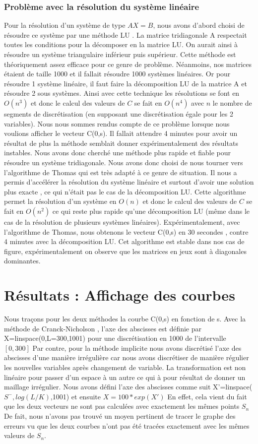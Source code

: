 \documentclass[11pt,a4paper]{article}
\begin{document}
\subsubsection{Problème avec la résolution du système linéaire}
Pour la résolution d'un système de type  $AX=B$, nous avons d'abord choisi de résoudre ce système par une méthode LU . La matrice tridiagonale A respectait toutes les conditions pour la décomposer en la matrice LU. On aurait ainsi à résoudre un système triangulaire inférieur puis supérieur. Cette méthode est théoriquement assez efficace pour ce genre de problème. Néanmoins, nos matrices étaient de taille 1000 et il fallait résoudre 1000 systèmes linéaires. Or pour résoudre 1 système linéaire, il faut faire la décomposition LU de la matrice A et résoudre 2 sous systèmes. Ainsi avec cette technique les résolutions se font en $O(n^3)$ et donc le calcul des valeurs de $C$ se fait en $O(n^4)$ avec $n$ le nombre de segments de discrétisation (en supposant une discrétisation égale pour les 2 variables). Nous nous sommes rendus compte de ce problème lorsque nous voulions afficher le vecteur C(0,s). Il fallait attendre 4 minutes pour avoir un résultat de plus la méthode semblait donner expérimentalement des résultats instables.
Nous avons donc cherché une méthode plus rapide et fiable pour résoudre un système tridiagonale. Nous avons donc choisi de nous tourner vers l'algorithme de Thomas qui est très adapté à ce genre de situation. Il nous a permis d'accélérer la résolution du système linéaire et surtout d'avoir une solution plus exacte , ce qui n'était pas le cas de la décomposition LU. Cette algorithme permet la résolution d'un système en $O(n)$ et donc le calcul des valeurs de $C$ se fait en $O(n^2)$ ce qui reste plus rapide qu'une décomposition LU (même dans le cas de la résolution de plusieurs systèmes linéaires). Expérimentalement, avec l'algorithme de Thomas, nous obtenons le vecteur C(0,s) en 30 secondes , contre 4 minutes avec la décomposition LU. Cet algorithme est stable dans nos cas de figure, expérimentalement on observe que les matrices en jeux sont à diagonales dominantes.
\section{Résultats : Affichage des courbes}
Nous traçons pour les deux méthodes la courbe C(0,s) en fonction de s.
Avec la méthode de Cranck-Nicholson , l'axe des abscisses est définie par X=linspace(0,L=300,1001) pour une discrétisation en 1000 de l'intervalle $[0,300]$
Par contre, pour la méthode implicite nous avons discrétisé l'axe des abscisses d'une manière irrégulière car nous avons discrétiser de manière régulier les nouvelles variables après changement de variable. La transformation est non linéaire pour passer d'un espace à un autre ce qui à pour résultat de donner un maillage irrégulier.
Nous avons défini l'axe des abscisses comme suit X'=linspace($S^-,log(L/K)$,1001) et ensuite $X= 100 * exp(X')$
En effet, cela vient du fait que les deux vecteurs ne sont pas calculées avec exactement les mêmes points $S_n$
De fait, nous n'avons pas trouvé un moyen pertinent de tracer le graphe des erreurs vu que les deux courbes n'ont pas été tracées exactement avec les mêmes valeurs de $S_n$.
\newpage
\end{document}

